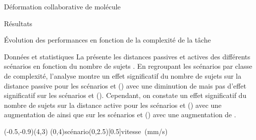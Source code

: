 \documentclass[myfrancais,ngerman,english,french]{mythesis}
\begin{document}
\begin{mychapter}{Déformation collaborative de molécule}
\begin{mysection}{Résultats}
\begin{mysubsection}{Évolution des performances en fonction de la complexité de la tâche}
\begin{mysubsubsection}{Données et statistiques}
					La  présente les distances passives  et actives  des différents scénarios  en fonction du nombre de sujets .
					En regroupant les scénarios par classe de complexité, l'analyse montre un effet significatif du nombre de sujets  sur la distance passive  pour les scénarios  et  () avec une diminution de  mais pas d'effet significatif sur les scénarios  et  ().
					Cependant, on constate un effet significatif du nombre de sujets  sur la distance active  pour les scénarios  et  () avec une augmentation de  ainsi que sur les scénarios  et  () avec une augmentation de .

					\begin{myfigure}
						\begin{myps}(-0.5,-0.9)(4,3)
							\myaxes(0,4){scénario}(0,2.5)[0.5]{vitesse~(mm/s)}
						\end{myps}
					\end{myfigure}


\end{mysubsubsection}
\end{mysubsection}
\end{mysection}
\end{mychapter}
\end{document}
